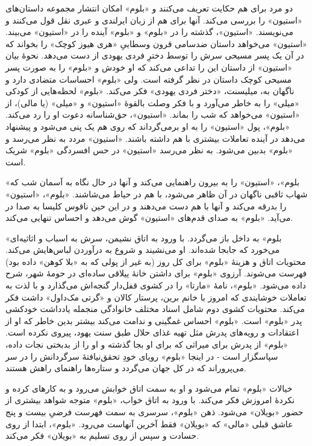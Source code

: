\documentclass[12pt]{book}
\newcommand{\noun}[1]{«{#1}»}
\begin{document}
    دو مرد برای هم حکایت تعریف می‌کنند و \noun{بلوم} امکان انتشار مجموعه داستان‌های \noun{استیون} را بررسی می‌کند. آنها برای هم از زبان ایرلندی و عبری نقل قول می‌کنند و می‌نویسند. \noun{استیون}، گذشته را در \noun{بلوم} و \noun{بلوم} آینده را در \noun{استیون} می‌بیند. \noun{استیون} می‌خواهد داستان ضدسامی قرون وسطاییِ «هری هیوز کوچک» را بخواند که در آن یک پسر مسیحی سرش را توسط دخترِ فردی یهودی از دست می‌دهد. نحوۀ بیان \noun{استیون} از داستان این را تداعی می‌کند که او خودش و \noun{بلوم} را به صورت پسر مسیحی کوچک داستان در نظر گرفته است. ولی \noun{بلوم} احساسات متضادی دارد و ناگهان به، میلیسنت، «دختر فردی یهودی» فکر می‌کند. \noun{بلوم} لحظه‌هایی از کودکی \noun{میلی} را به خاطر می‌آورد و با فکر وصلت بالقوۀ \noun{استیون} و \noun{میلی} (یا مالی)، از \noun{استیون} می‌خواهد که شب را بماند. \noun{استیون}، حق‌شناسانه دعوت او را رد می‌کند. \noun{بلوم}، پول \noun{استیون} را به او برمی‌گرداند که روی هم یک پنی می‌شود و پیشنهاد می‌دهد در آینده تعاملات بیشتری با هم داشته باشند. \noun{استیون} مردد به نظر می‌رسد و \noun{بلوم} بدبین می‌شود. به نظر می‌رسد \noun{استیون} در حس افسردگی \noun{بلوم} شریک است.

    \noun{بلوم}، \noun{استیون} را به بیرون راهنمایی می‌کند و آنها در حال نگاه به آسمان شب که شهاب ثاقبی ناگهان در آن ظاهر می‌شود، با هم در حیاط می‌شاشند. \noun{بلوم}، \noun{استیون} را بدرقه می‌کند و آنها با هم دست می‌دهند و در این حین ناقوس کلیسا به صدا در می‌آید. \noun{بلوم} به صدای قدم‌های \noun{استیون} گوش می‌دهد و احساس تنهایی می‌کند.

    \noun{بلوم} به داخل باز می‌گردد. با ورود به اتاق نشیمن، سرش به اسباب و اثاثیه‌ای می‌خورد که جابجا شده‌اند. او می‌نشیند و شروع به درآوردن لباس‌هایش می‌کند. محتویات اتاق و هزینۀ \noun{بلوم} برای کل روز (به غیر از پولی که به \noun{بلا کوهن} داده بود) فهرست می‌شوند. آرزوی \noun{بلوم} برای داشتن خانۀ ییلاقی ساده‌ای در حومۀ شهر، شرح داده می‌شود. \noun{بلوم}، نامۀ \noun{مارتا} را در کشوی قفل‌دار گنجه‌اش می‌گذارد و با لذت به تعاملات خوشایندی که امروز با خانم برین، پرستار کالان و \noun{گرتی مک‌داول‬} داشت فکر می‌کند. محتویات کشوی دوم شامل اسناد مختلف خانوادگی منجمله یادداشت خودکشی پدر \noun{بلوم} است. \noun{بلوم} احساس غمگینی و ندامت می‌کند بیشتر بدین خاطر که او از اعتقادات و رویه‌های پدرش مثل تهیه غذای حلال طبق سنت یهود، پیروی نکرده است. \noun{بلوم} از پدرش برای میراثی که برای او بجا گذشته و او را از بدبختی نجات داده، سپاسگزار است - در اینجا \noun{بلوم} رویای خودِ تحقق‌نیافتۀ سرگردانش را در سر می‌پروراند که در کل جهان می‌گردد و ستاره‌ها راهنمای راهش هستند.

    خیالات \noun{بلوم} تمام می‌شود و او به سمت اتاق خوابش می‌رود و به کارهای کرده و نکردۀ امروزش فکر می‌کند. با ورود به اتاق خواب، \noun{بلوم} متوجه شواهد بیشتری از حضور \noun{بویلان} می‌شود. ذهن \noun{بلوم}، سرسری به سمت فهرست فرضیِ بیست و پنج عاشق قبلی \noun{مالی} که \noun{بویلان} فقط آخرین آنهاست می‌رود. \noun{بلوم}، ابتدا از روی حسادت و سپس از روی تسلیم به \noun{بویلان} فکر می‌کند.
\end{document}
